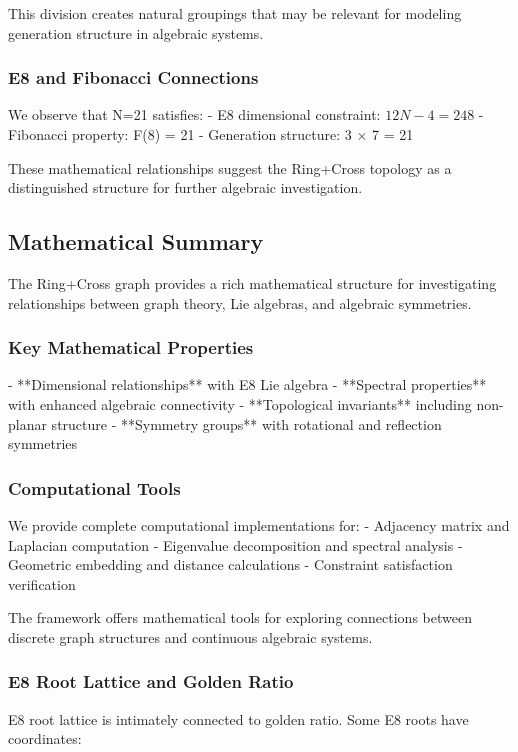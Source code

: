 \documentclass[12pt,a4paper]{article}
\begin{document}
This division creates natural groupings that may be relevant for modeling generation structure in algebraic systems.

\subsubsection{E8 and Fibonacci Connections}
We observe that N=21 satisfies:
- E8 dimensional constraint: $12N - 4 = 248$
- Fibonacci property: F(8) = 21
- Generation structure: 3 × 7 = 21

These mathematical relationships suggest the Ring+Cross topology as a distinguished structure for further algebraic investigation.

\subsection{Mathematical Summary}
The Ring+Cross graph provides a rich mathematical structure for investigating relationships between graph theory, Lie algebras, and algebraic symmetries.

\subsubsection{Key Mathematical Properties}
- **Dimensional relationships** with E8 Lie algebra
- **Spectral properties** with enhanced algebraic connectivity
- **Topological invariants** including non-planar structure
- **Symmetry groups** with rotational and reflection symmetries

\subsubsection{Computational Tools}
We provide complete computational implementations for:
- Adjacency matrix and Laplacian computation
- Eigenvalue decomposition and spectral analysis
- Geometric embedding and distance calculations
- Constraint satisfaction verification

The framework offers mathematical tools for exploring connections between discrete graph structures and continuous algebraic systems.

\subsubsection{E8 Root Lattice and Golden Ratio}

E8 root lattice is intimately connected to golden ratio. Some E8 roots have coordinates:
\end{document}
